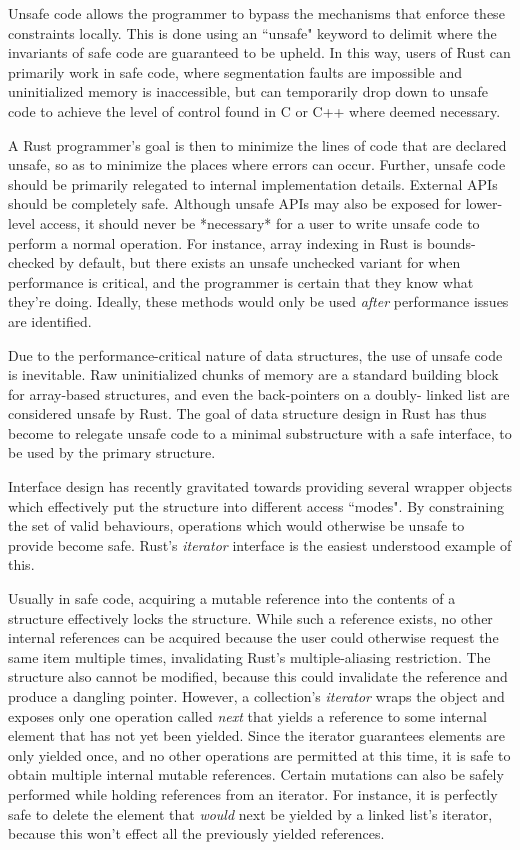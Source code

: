\documentclass{cccg13}
\begin{document}
Unsafe code allows the programmer to bypass the mechanisms that enforce these
constraints locally. This is done using an ``unsafe" keyword to delimit where
the invariants of safe code are guaranteed to be upheld. In this way, users of
Rust can primarily work in safe code, where segmentation faults are impossible
and uninitialized memory is inaccessible, but can temporarily drop down to
unsafe code to achieve the level of control found in C or C++ where deemed
necessary.

A Rust programmer's goal is then to minimize the lines of code that are
declared unsafe, so as to minimize the places where errors can occur. Further,
unsafe code should be primarily relegated to internal implementation details.
External APIs should be completely safe. Although unsafe APIs may also be
exposed for lower-level access, it should never be *necessary* for a user to
write unsafe code to perform a normal operation. For instance, array indexing
in Rust is bounds-checked by default, but there exists an unsafe unchecked
variant for when performance is critical, and the programmer is certain that
they know what they're doing. Ideally, these methods would only be used
\emph{after} performance issues are identified.

Due to the performance-critical nature of data structures, the use of unsafe
code is inevitable. Raw uninitialized chunks of memory are a standard building
block for array-based structures, and even the back-pointers on a doubly-
linked list are considered unsafe by Rust. The goal of data structure design
in Rust has thus become to relegate unsafe code to a minimal substructure with
a safe interface, to be used by the primary structure.

Interface design has recently gravitated towards providing several wrapper
objects which effectively put the structure into different access ``modes". By
constraining the set of valid behaviours, operations which would otherwise be
unsafe to provide become safe. Rust's \emph{iterator} interface is the easiest
understood example of this.

Usually in safe code, acquiring a mutable reference into the contents of a
structure effectively locks the structure. While such a reference exists, no
other internal references can be acquired because the user could otherwise
request the same item multiple times, invalidating Rust's multiple-aliasing
restriction. The structure also cannot be modified, because this could
invalidate the reference and produce a dangling pointer. However, a
collection's \emph{iterator} wraps the object and exposes only one operation
called \emph{next} that yields a reference to some internal element that has
not yet been yielded. Since the iterator guarantees elements are only yielded
once, and no other operations are permitted at this time, it is safe to obtain
multiple internal mutable references. Certain mutations can also be safely
performed while holding references from an iterator. For instance, it is
perfectly safe to delete the element that \emph{would} next be yielded by a
linked list's iterator, because this won't effect all the previously yielded
references.
\end{document}
